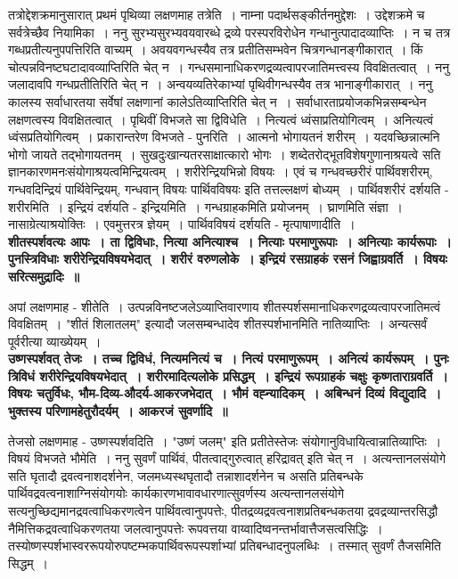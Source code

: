 	तत्रोद्देशक्रमानुसारात् प्रथमं पृथिव्या लक्षणमाह तत्रेति~। नाम्ना पदार्थसङ्कीर्तनमुद्देशः~। उद्देशक्रमे च सर्वत्रेच्छैव नियामिका~। ननु सुरभ्यसुरभ्यवयवारब्धे द्रव्ये परस्परविरोधेन गन्धानुत्पादादव्याप्तिः~। न च तत्र गब्धप्रतीत्यनुपपत्तिरिति वाच्यम्~। अवयवगन्धस्यैव तत्र प्रतीतिसम्भवेन चित्रगन्धानङ्गीकारात्~। किं चोत्पन्नविनष्टघटादावव्याप्तिरिति चेत् न~। गन्धसमानाधिकरणद्रव्यत्वापरजातिमत्त्वस्य विवक्षितत्वात्~। ननु जलादावपि गन्धप्रतीतिरिति चेत् न~। अन्वयव्यतिरेकाभ्यां पृथिवीगन्धस्यैव तत्र भानाङ्गीकारात्~। ननु कालस्य सर्वाधारतया सर्वेषां लक्षणानां कालेऽतिव्याप्तिरिति चेत् न~। सर्वाधारताप्रयोजकभिन्नसम्बन्धेन लक्षणत्वस्य विवक्षितत्वात्~। पृथिवीं विभजते सा द्विविधेति~। नित्यत्वं ध्वंसाप्रतियोगित्वम्~। अनित्यत्वं ध्वंसप्रतियोगित्वम्~। प्रकारान्तरेण विभजते - पुनरिति~। आत्मनो भोगायतनं शरीरम्~। यदवच्छिन्नात्मनि भोगो जायते तद्भोगायतनम्~। सुखदुःखान्यतरसाक्षात्कारो भोगः~। शब्देतरोद्भूतविशेषगुणानाश्रयत्वे सति ज्ञानकारणमनःसंयोगाश्रयत्वमिन्द्रियत्वम्~। शरीरेन्द्रियभिन्नो विषयः~। एवं च गन्धवच्छरीरं पार्थिवशरीरम्, गन्धवदिन्द्रियं पार्थिवेन्द्रियम्, गन्धवान् विषयः पार्थिवविषयः इति तत्तल्लक्षणं बोध्यम्~। पार्थिवशरीरं दर्शयति - शरीरमिति~। इन्द्रियं दर्शयति - इन्द्रियमिति~। गन्धग्राहकमिति प्रयोजनम्~। घ्राणमिति संज्ञा~। नासाग्रेत्याश्रयोक्तिः~। एवमुत्तरत्र ज्ञेयम्~। पार्थिवविषयं दर्शयति - मृत्पाषाणादीति~।\\[10pt]
{\bfseries शीतस्पर्शवत्यः आपः~। ता द्विविधाः, नित्या अनित्याश्च~। नित्याः परमाणुरूपाः~। अनित्याः कार्यरूपाः~। पुनस्त्रिविधाः शरीरेन्द्रियविषयभेदात्~। शरीरं वरुणलोके~। इन्द्रियं रसग्राहकं रसनं जिह्वाग्रवर्ति~। विषयः सरित्समुद्रादिः~॥}\par
	अपां लक्षणमाह - शीतेति~। उत्पन्नविनष्टजलेऽव्याप्तिवारणाय शीतस्पर्शसमानाधिकरणद्रव्यत्वापरजातिमत्वं विवक्षितम्~। "शीतं शिलातलम्" इत्यादौ जलसम्बन्धादेव शीतस्पर्शभानमिति नातिव्याप्तिः~। अन्यत्सर्वं पूर्वरीत्या व्याख्येयम्~।\\[10pt]
{\bfseries उष्णस्पर्शवत् तेजः~। तच्च द्विविधं, नित्यमनित्यं च~। नित्यं परमाणुरूपम्~। अनित्यं कार्यरूपम्~। पुनः त्रिविधं शरीरेन्द्रियविषयभेदात्~। शरीरमादित्यलोके प्रसिद्धम्~। इन्द्रियं रूपग्राहकं चक्षुः कृष्णताराग्रवर्ति~। विषयः चतुर्विधः, भौम-दिव्य-औदर्य-आकरजभेदात्~। भौमं वह्न्यादिकम्~। अबिन्धनं दिव्यं विद्युदादि~। भुक्तस्य परिणामहेतुरौदर्यम्~। आकरजं सुवर्णादि~॥}\par
	तेजसो लक्षणमाह - उष्णस्पर्शवदिति~। "उष्णं जलम्" इति प्रतीतेस्तेजः संयोगानुविधायित्वान्नातिव्याप्तिः~। विषयं विभजते भौमेति~। ननु सुवर्णं पार्थिवं, पीतत्वाद्गुरुत्वात् हरिद्रावत् इति चेत् न~। अत्यन्तानलसंयोगे सति घृतादौ द्रवत्वनाशदर्शनेन, जलमध्यस्थघृतादौ तन्नाशादर्शनेन च असति प्रतिबन्धके पार्थिवद्रवत्वनाशाग्निसंयोगयोः कार्यकारणभावावधारणात्सुवर्णस्य अत्यन्तानलसंयोगे सत्यनुच्छिद्यमानद्रवत्वाधिकरणत्वेन पार्थिवत्वानुपपत्तेः, पीतद्रव्यद्रवत्वनाशप्रतिबन्धकतया द्रवद्रव्यान्तरसिद्धौ नैमित्तिकद्रवत्वाधिकरणतया जलत्वानुपपत्तेः रूपवत्तया वाय्वादिष्वनन्तर्भावात्तैजसत्वसिद्धिः~। तस्योष्णस्पर्शभास्वररूपयोरुपष्टम्भकपार्थिवरूपस्पर्शाभ्यां प्रतिबन्धादनुपलब्धिः~। तस्मात् सुवर्णं तैजसमिति सिद्धम्~।\\[10pt]
